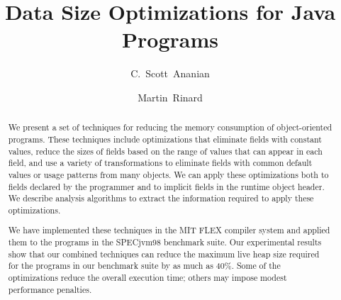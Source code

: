 \documentclass[oribibl]{llncs}
\title{Data Size Optimizations for Java Programs}
\author{C.~Scott~Ananian \and Martin~Rinard}
\institute{%
Laboratory for Computer Science\\
Massachusetts Institute of Technology\\ 
Cambridge, MA 02139 \\
\email{\{cananian, rinard\}@lcs.mit.edu}
}
\begin{document}

%
\maketitle
%
\begin{abstract}
We present a set of techniques for reducing the memory consumption of
object-oriented programs. These techniques 
include optimizations that eliminate fields with
constant values, reduce the sizes of fields based on the range
of values that can appear in each field, and use a variety of
transformations to eliminate fields with common default values
or usage patterns from many objects.
We can apply these optimizations both 
to fields declared by the programmer and to implicit fields in
the runtime object header. We describe analysis
algorithms to extract the information required to apply these
optimizations. 

We have implemented these techniques in the MIT FLEX compiler
system and applied them to the programs in the SPECjvm98 
benchmark suite. Our experimental results show that 
our combined techniques can reduce the maximum live heap size required
for the programs in our benchmark suite by as much as 40\%.
Some of the optimizations reduce the overall execution time;
others may impose modest performance penalties.
\end{abstract}
%
\end{document}

